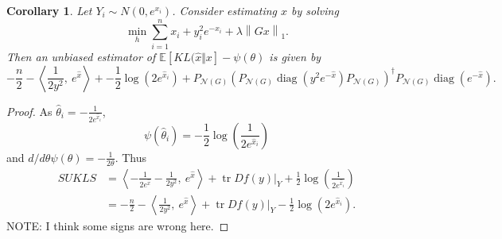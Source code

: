 \documentclass[11pt]{article}
\newcommand{\norm}[1]{\left\lVert #1 \right\rVert}
\newcommand{\E}{\mathbb{E}}
\newcommand{\Expect}[1]{\E\left[#1\right]}
\renewcommand{\hat}{\widehat}
\DeclareMathOperator*{\trace}{tr}
\DeclareMathOperator*{\diag}{diag}
\newcommand{\Pnd}{P_{\mathcal{N}(G)}}
\theoremstyle{plain}
\newtheorem{corollary}[cor]{Corollary}
\begin{document}
\begin{corollary}
   Let $Y_i \sim N(0, e^{x_i})$. Consider estimating $x$ by solving
  \begin{equation}
    \label{eq:15}
    \min_h \sum_{i=1}^n x_i + y_i^2e^{-x_i} + \lambda \norm{Gx}_1.
  \end{equation}
  Then an unbiased estimator of $\Expect{KL(\hat x \Vert
    x} - \psi(\theta)$ is given by
  \begin{equation}
    \label{eq:18}
    -\frac{n}{2} - \left\langle \frac{1}{2y^2},\ e^{\hat
        x}\right\rangle + 
    -\frac{1}{2}\log\left(2e^{\hat
        x_i}\right) + \Pnd \left(\Pnd
      \diag\left(y^2e^{-\hat x}\right) \Pnd\right)^\dagger \Pnd
      \diag\left( e^{-\hat x}\right). 
  \end{equation}
\end{corollary}
\begin{proof}
  As $\hat \theta_i = -\frac{1}{2e^{\hat x_i}}$, 
  \[
    \psi(\hat\theta_i) = -\frac{1}{2}\log\left(\frac{1}{2e^{\hat
          x_i}}\right)
  \]
  and $d/d\theta \psi(\theta) = -\frac{1}{2\theta}$. Thus
  \begin{align}
    SUKLS 
    &= \left\langle -\frac{1}{2e^{\hat x}} - \frac{1}{2y^2},\ e^{\hat
      x}\right\rangle + \trace Df(y) \bigg\vert_Y
      +\frac{1}{2}\log\left(\frac{1}{2e^{\hat
      x_i}}\right)\\
    &= -\frac{n}{2} - \left\langle \frac{1}{2y^2},\ e^{\hat
      x}\right\rangle + \trace Df(y) \bigg\vert_Y
      -\frac{1}{2}\log\left(2e^{\hat
      x_i}\right).
  \end{align}
NOTE: I think some signs are wrong here.
\end{proof}



\end{document}
